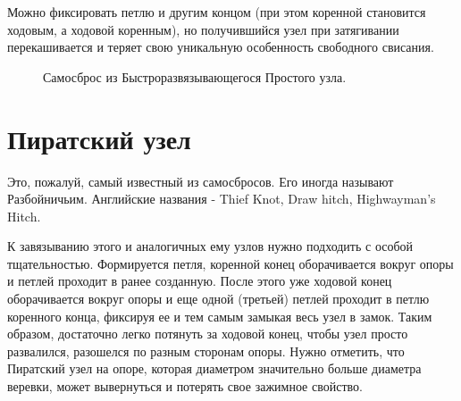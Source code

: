\documentclass{artikel1}
\begin{document}
Можно фиксировать петлю и другим концом (при этом коренной становится ходовым, а ходовой коренным), но получившийся узел при затягивании перекашивается и теряет свою уникальную особенность свободного свисания.

\begin{figure}[H]\centering
	\subfloat[Завязывание]{\label{ris:Arbor_samosbros_2_1}
	\tcbox[enhanced jigsaw,colframe=black,opacityframe=0.5,opacityback=0.5,height=6.5cm]
		{\centering
			}
		}
\hfill
	\subfloat[Результат]{\label{ris:Arbor_samosbros_2_2}
	\tcbox[enhanced jigsaw,colframe=black,opacityframe=0.5,opacityback=0.5,height=6.5cm]
		{\centering
			}
		}
	\caption{Самосброс из Быстроразвязывающегося Простого узла.}\label{ris:Arbor_samosbros}
\end{figure}

\section{Пиратский узел}

Это, пожалуй, самый известный из самосбросов. Его иногда называют Разбойничьим. Английские названия - Thief Knot, Draw hitch, Highwayman's Hitch.

\begin{figure}[H]\centering
	\subfloat[Завязывание]{\label{ris:Piratsky_1_1}
	\tcbox[enhanced jigsaw,colframe=black,opacityframe=0.5,opacityback=0.5,height=6.5cm]
		{\centering
			}
		}
\hfill
	\subfloat[Завязывание]{\label{ris:Piratsky_1_2}
	\tcbox[enhanced jigsaw,colframe=black,opacityframe=0.5,opacityback=0.5,height=6.5cm]
		{\centering
			}
		}
\end{figure}

К завязыванию этого и аналогичных ему узлов нужно подходить с особой тщательностью. Формируется петля, коренной конец оборачивается вокруг опоры и петлей проходит в ранее созданную. После этого уже ходовой конец оборачивается вокруг опоры и еще одной (третьей) петлей проходит в петлю коренного конца, фиксируя ее и тем самым замыкая весь узел в замок. Таким образом, достаточно легко потянуть за ходовой конец, чтобы узел просто развалился, разошелся по разным сторонам опоры. Нужно отметить, что Пиратский узел на опоре, которая диаметром значительно больше диаметра веревки, может вывернуться и потерять свое зажимное свойство.
\end{document}
